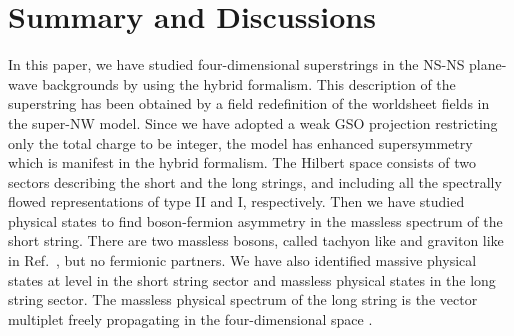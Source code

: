 \documentclass[a4paper,seceq,preprint]{ptptex}
\begin{document}
\section{Summary and Discussions}\label{summary}

In this paper, we have studied four-dimensional superstrings
in the NS-NS plane-wave backgrounds by using the hybrid 
formalism. This description of the superstring has been 
obtained by a field redefinition of the worldsheet 
fields in the super-NW model.\cite{HS2}
Since we have adopted a weak GSO projection restricting only
the total \coordHE{} charge to be integer,
the model has enhanced supersymmetry which is manifest 
in the hybrid formalism. The Hilbert space consists of 
two sectors describing the short and the long strings,
and including all the spectrally flowed representations of 
type II and I, respectively.\cite{KK,KP} 
Then we have studied physical states to find boson-fermion 
asymmetry in the massless spectrum of the short string. 
There are two massless bosons, called tachyon like 
and graviton like in Ref.~, but no fermionic 
partners. We have also identified massive physical 
states at level \coordHE{} in the short string sector
and massless physical states in the long string sector. 
The massless physical spectrum of the long string is 
the vector multiplet freely propagating 
in the four-dimensional space \coordHE{}.
\end{document}
